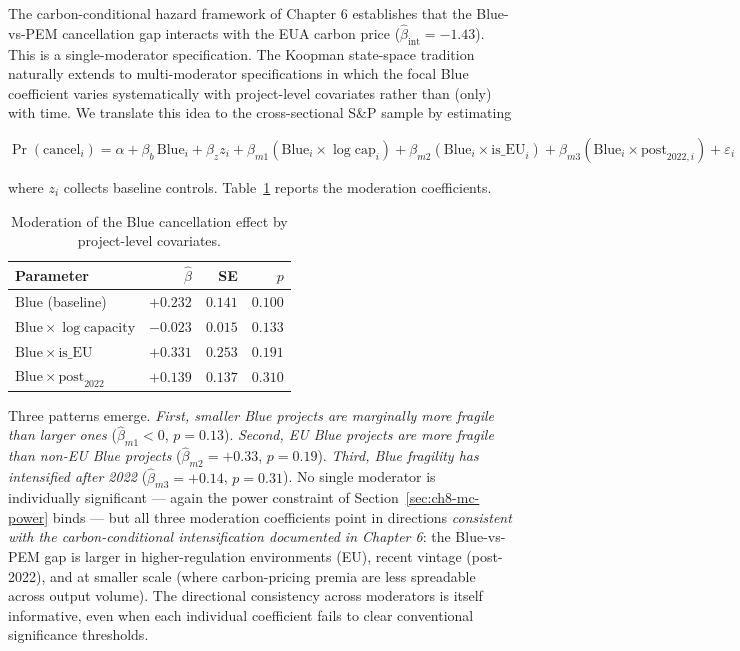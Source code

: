 \documentclass[11pt,a4paper]{article}
\begin{document}
The carbon-conditional hazard framework of Chapter 6 establishes that the Blue-vs-PEM cancellation gap interacts with the EUA carbon price ($\hat\beta_{\mathrm{int}} = -1.43$). This is a single-moderator specification. The Koopman state-space tradition naturally extends to multi-moderator specifications in which the focal Blue coefficient varies systematically with project-level covariates rather than (only) with time. We translate this idea to the cross-sectional S\&P sample by estimating

$$
\Pr(\mathrm{cancel}_i) = \alpha + \beta_b\, \mathrm{Blue}_i + \beta_z z_i + \beta_{m1} (\mathrm{Blue}_i \times \log\mathrm{cap}_i) + \beta_{m2} (\mathrm{Blue}_i \times \mathrm{is\_EU}_i) + \beta_{m3} (\mathrm{Blue}_i \times \mathrm{post}_{2022,i}) + \varepsilon_i
$$

where $z_i$ collects baseline controls. Table~\ref{tab:ch8-mechanism} reports the moderation coefficients.

\begin{table}[ht]
\centering
\caption{Moderation of the Blue cancellation effect by project-level covariates.}
\label{tab:ch8-mechanism}
\begin{tabular}{lrrr}
\toprule
Parameter & $\hat\beta$ & SE & $p$ \\
\midrule
$\mathrm{Blue}$ (baseline) & $+0.232$ & $0.141$ & $0.100$ \\
$\mathrm{Blue} \times \log\mathrm{capacity}$ & $-0.023$ & $0.015$ & $0.133$ \\
$\mathrm{Blue} \times \mathrm{is\_EU}$ & $+0.331$ & $0.253$ & $0.191$ \\
$\mathrm{Blue} \times \mathrm{post}_{2022}$ & $+0.139$ & $0.137$ & $0.310$ \\
\bottomrule
\end{tabular}
\end{table}

Three patterns emerge. \emph{First, smaller Blue projects are marginally more fragile than larger ones} ($\hat\beta_{m1} < 0$, $p = 0.13$). \emph{Second, EU Blue projects are more fragile than non-EU Blue projects} ($\hat\beta_{m2} = +0.33$, $p = 0.19$). \emph{Third, Blue fragility has intensified after 2022} ($\hat\beta_{m3} = +0.14$, $p = 0.31$). No single moderator is individually significant — again the power constraint of Section~\ref{sec:ch8-mc-power} binds — but all three moderation coefficients point in directions \emph{consistent with the carbon-conditional intensification documented in Chapter 6}: the Blue-vs-PEM gap is larger in higher-regulation environments (EU), recent vintage (post-2022), and at smaller scale (where carbon-pricing premia are less spreadable across output volume). The directional consistency across moderators is itself informative, even when each individual coefficient fails to clear conventional significance thresholds.
\end{document}

